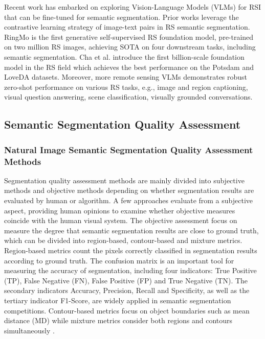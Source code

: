 Recent work has embarked on exploring Vision-Language Models (VLMs) for RSI that can be fine-tuned for semantic segmentation. Prior works leverage the contrastive learning strategy of image-text pairs in RS semantic segmentation\cite{10005113}. RingMo\cite{sun2022ringmo} is the first generative self-supervised RS foundation model, pre-trained on two million RS images, achieving SOTA on four downstream tasks, including semantic segmentation. Cha et al. \cite{cha2023billion} introduce the first billion-scale foundation model in the RS field which achieves the best performance on the Potsdam and LoveDA \cite{wang2021loveda} datasets. Moreover, more remote sensing  VLMs\cite{kuckreja2024geochat,liu2024remoteclip} demonstrates robust zero-shot performance on various RS tasks, e.g., image and region captioning, visual question answering, scene classification, visually grounded conversations.
\subsection{Semantic Segmentation Quality Assessment}\label{section ml}
\subsubsection{Natural Image Semantic Segmentation Quality Assessment Methods}\label{section nml}
Segmentation quality assessment methods are mainly divided into subjective methods and objective methods depending on whether segmentation results are evaluated by human or algorithm. 
A few approaches evaluate from a subjective aspect\cite{chen2019visual}, providing human opinions to examine whether objective measures coincide with the human visual system. The objective assessment focus on measure the degree that semantic segmentation results are close to ground truth, which can be divided into region-based, contour-based and mixture metrics. Region-based metrics count the pixels correctly classified in segmentation results according to ground truth. 
The confusion matrix is an important tool for measuring the accuracy of segmentation, including four indicators: True Positive (TP), False Negative (FN), False Positive (FP) and True Negative (TN). The secondary indicators Accuracy, Precision, Recall and Specificity, as well as the tertiary indicator F1-Score, are widely applied in semantic segmentation competitions.
Contour-based metrics focus on object boundaries such as  mean distance (MD) \cite{csurka2013good} while mixture metrics consider both regions and contours simultaneously \cite{cheng2021boundary}.


